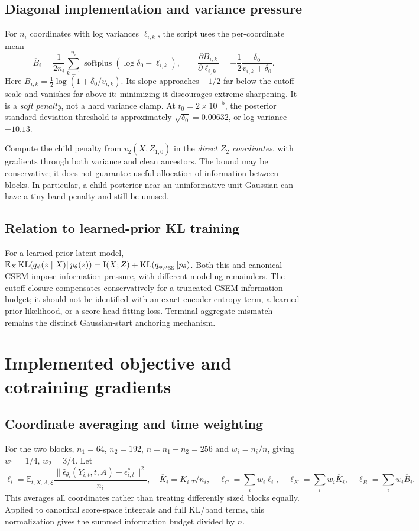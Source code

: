 \documentclass[10pt]{article}
\newcommand{\E}{\mathbb E}
\newcommand{\KL}{\operatorname{KL}}
\newcommand{\II}{\mathrm I}
\begin{document}
\subsection{Diagonal implementation and variance pressure}
For $n_i$ coordinates with log variances $\ell_{i,k}$, the script uses the per-coordinate mean
\begin{equation}
\overline B_i=\frac{1}{2n_i}\sum_{k=1}^{n_i}\operatorname{softplus}(\log\delta_0-\ell_{i,k}),\qquad
\frac{\partial B_{i,k}}{\partial\ell_{i,k}}=-\frac12\frac{\delta_0}{v_{i,k}+\delta_0}.
\label{eq:bandslope}
\end{equation}
Here $B_{i,k}=\tfrac12\log(1+\delta_0/v_{i,k})$. Its slope approaches $-1/2$ far below the cutoff scale and vanishes far above it: minimizing it discourages extreme sharpening. It is a \emph{soft penalty}, not a hard variance clamp. At $t_0=2\times10^{-5}$, the posterior standard-deviation threshold is approximately $\sqrt{\delta_0}=0.00632$, or log variance $-10.13$.

Compute the child penalty from $v_2(X,Z_{1,0})$ in the \emph{direct $Z_2$ coordinates}, with gradients through both variance and clean ancestors. The bound may be conservative; it does not guarantee useful allocation of information between blocks. In particular, a child posterior near an uninformative unit Gaussian can have a tiny band penalty and still be unused.

\subsection{Relation to learned-prior KL training}
For a learned-prior latent model, $\E_X\KL(q_\phi(z\mid X)\|p_\theta(z))=\II(X;Z)+\KL(q_{\phi,\rm agg}\|p_\theta)$. Both this and canonical CSEM impose information pressure, with different modeling remainders. The cutoff closure compensates conservatively for a truncated CSEM information budget; it should not be identified with an exact encoder entropy term, a learned-prior likelihood, or a score-head fitting loss. Terminal aggregate mismatch remains the distinct Gaussian-start anchoring mechanism.

\newpage
\section{Implemented objective and cotraining gradients}
\subsection{Coordinate averaging and time weighting}
For the two blocks, $n_1=64$, $n_2=192$, $n=n_1+n_2=256$ and $w_i=n_i/n$, giving $w_1=1/4$, $w_2=3/4$. Let
\begin{equation}
\ell_i=\E_{t,X,A,\xi}\frac{\|\widehat\epsilon_{\theta_i}(Y_{i,t},t,A)-\epsilon^*_{i,t}\|^2}{n_i},\quad
\overline K_i=K_{i,T}/n_i,\quad
\ell_C=\sum_iw_i\ell_i,\quad \ell_K=\sum_iw_i\overline K_i,\quad \ell_B=\sum_iw_i\overline B_i.
\end{equation}
This averages all coordinates rather than treating differently sized blocks equally. Applied to canonical score-space integrals and full KL/band terms, this normalization gives the summed information budget divided by $n$.
\end{document}
